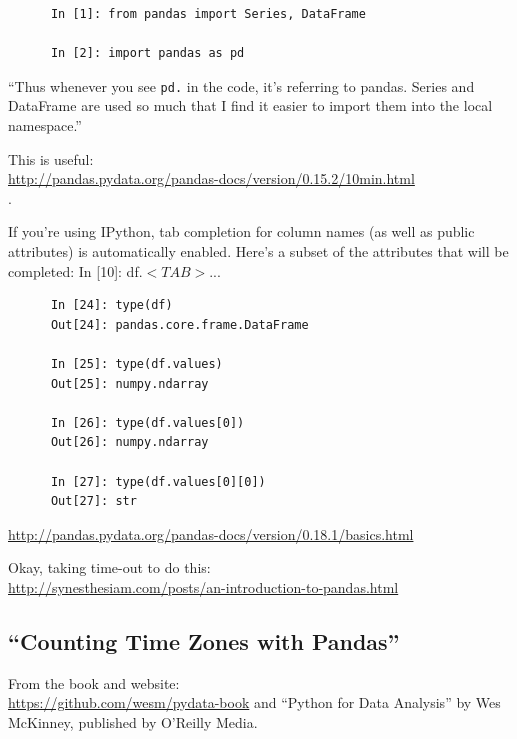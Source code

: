 \documentclass[11pt,a4paper]{article}
\begin{document}
    \begin{lstlisting}
      In [1]: from pandas import Series, DataFrame

      In [2]: import pandas as pd
    \end{lstlisting}
    ``Thus whenever you see {\tt pd.} in the code, it's referring to
    pandas. Series and DataFrame are used so much that I find it easier to
    import them into the local namespace.''

    


    \smallskip
    \smallskip
    \noindent 
    This is useful: \\
    \href{http://pandas.pydata.org/pandas-docs/version/0.15.2/10min.html}{http://pandas.pydata.org/pandas-docs/version/0.15.2/10min.html}\\.
    
    \smallskip
    \smallskip
    \noindent 
    If you’re using IPython, tab completion for column names (as well as
    public attributes) is automatically enabled. Here’s a subset of the
    attributes that will be completed:
    In [10]: df.$<TAB>$...
    
    \begin{lstlisting}
      In [24]: type(df)
      Out[24]: pandas.core.frame.DataFrame
      
      In [25]: type(df.values)
      Out[25]: numpy.ndarray
      
      In [26]: type(df.values[0])
      Out[26]: numpy.ndarray
      
      In [27]: type(df.values[0][0])
      Out[27]: str
    \end{lstlisting}



    
    \smallskip
    \smallskip
    \noindent 
    \href{http://pandas.pydata.org/pandas-docs/version/0.18.1/basics.html}{http://pandas.pydata.org/pandas-docs/version/0.18.1/basics.html}
    
    \smallskip
    \smallskip
    \noindent 
    Okay, taking time-out to do this:\\
    \href{http://synesthesiam.com/posts/an-introduction-to-pandas.html}{http://synesthesiam.com/posts/an-introduction-to-pandas.html}
    
    

    \subsection{``Counting Time Zones with Pandas''}
    From the book and website:\\
    \href{https://github.com/wesm/pydata-book}{https://github.com/wesm/pydata-book}
    and ``Python for Data Analysis'' by Wes McKinney, published by O'Reilly Media. 
\end{document}
